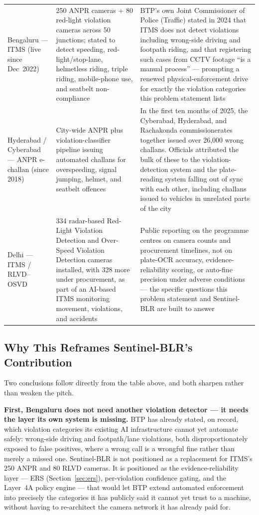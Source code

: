 \documentclass[11pt,a4paper]{article}
\begin{document}
\begin{longtable}{L{3.3cm} L{5.8cm} L{6.2cm}}
    Bengaluru --- ITMS (live since Dec~2022) & 250 ANPR cameras + 80 red-light violation cameras across 50 junctions; stated to detect speeding, red-light/stop-lane, helmetless riding, triple riding, mobile-phone use, and seatbelt non-compliance~\cite{btpitms2023} & BTP's own Joint Commissioner of Police (Traffic) stated in 2024 that ITMS does not detect violations including wrong-side driving and footpath riding, and that registering such cases from CCTV footage ``is a manual process'' --- prompting a renewed physical-enforcement drive for exactly the violation categories this problem statement lists~\cite{btpanucheth2024} \\
    Hyderabad / Cyberabad --- ANPR e-challan (since 2018) & City-wide ANPR plus violation-classifier pipeline issuing automated challans for overspeeding, signal jumping, helmet, and seatbelt offences~\cite{hyderabadanpr2018} & In the first ten months of 2025, the Cyberabad, Hyderabad, and Rachakonda commissionerates together issued over 26,000 wrong challans. Officials attributed the bulk of these to the violation-detection system and the plate-reading system falling out of sync with each other, including challans issued to vehicles in unrelated parts of the city~\cite{hyderabadwrongchallan2025} \\
    Delhi --- ITMS / RLVD--OSVD & 334 radar-based Red-Light Violation Detection and Over-Speed Violation Detection cameras installed, with 328 more under procurement, as part of an AI-based ITMS monitoring movement, violations, and accidents~\cite{delhiitms2026} & Public reporting on the programme centres on camera counts and procurement timelines, not on plate-OCR accuracy, evidence-reliability scoring, or auto-fine precision under adverse conditions --- the specific questions this problem statement and Sentinel-BLR are built to answer \\
\end{longtable}

\subsection*{Why This Reframes Sentinel-BLR's Contribution}

Two conclusions follow directly from the table above, and both sharpen rather than weaken the pitch.

\noindent\textbf{First, Bengaluru does not need another violation detector --- it needs the layer its own system is missing.} BTP has already stated, on record, which violation categories its existing AI infrastructure cannot yet automate safely: wrong-side driving and footpath/lane violations, both disproportionately exposed to false positives, where a wrong call is a wrongful fine rather than merely a missed one. Sentinel-BLR is not positioned as a replacement for ITMS's 250 ANPR and 80 RLVD cameras. It is positioned as the evidence-reliability layer --- ERS (Section~\ref{sec:ers}), per-violation confidence gating, and the Layer~4A policy engine --- that would let BTP extend automated enforcement into precisely the categories it has publicly said it cannot yet trust to a machine, without having to re-architect the camera network it has already paid for.
\end{document}
